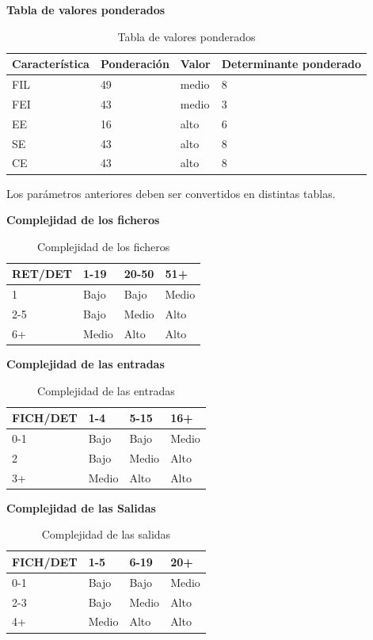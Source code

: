 \documentclass[a4paper,12pt,openany,oneside]{book}
\begin{document}
\begin{table}
\textbf{Tabla de valores ponderados}\\
\begin{tabular}{| l | l | l | l |}
\hline
\textbf{Característica} & \textbf{Ponderación} & \textbf{Valor} & \textbf{Determinante ponderado} \\
\hline
FIL & 49 & medio & 8\\
\hline
FEI & 43 & medio & 3\\
\hline
EE & 16  & alto  & 6\\
\hline
SE & 43  & alto  & 8\\
\hline
CE & 43  & alto  & 8\\
\hline
\end{tabular}
\caption{Tabla de valores ponderados}
\end{table}
Los parámetros anteriores deben ser convertidos en distintas tablas.
\begin{table}
\textbf{Complejidad de los ficheros}\\
\begin{tabular}{| l | l | l | l |}
\hline
\textbf{RET/DET} & \textbf{1-19} & \textbf{20-50} & \textbf{51+} \\
\hline
1 & Bajo & Bajo & Medio\\
\hline
2-5 & Bajo & Medio & Alto\\
\hline
6+ & Medio & Alto & Alto\\
\hline
\end{tabular}
\caption{Complejidad de los ficheros}
\end{table}
\begin{table}
\textbf{Complejidad de las entradas}\\
\begin{tabular}{| l | l | l | l |}
\hline
\textbf{FICH/DET} & \textbf{1-4} & \textbf{5-15} & \textbf{16+} \\
\hline
0-1 & Bajo & Bajo & Medio\\
\hline
2 & Bajo & Medio & Alto\\
\hline
3+ & Medio & Alto & Alto\\
\hline
\end{tabular}
\caption{Complejidad de las entradas}
\end{table}
\begin{table}
\textbf{Complejidad de las Salidas}\\
\begin{tabular}{| l | l | l | l |}
\hline
\textbf{FICH/DET} & \textbf{1-5} & \textbf{6-19} & \textbf{20+} \\
\hline
0-1 & Bajo & Bajo & Medio\\
\hline
2-3 & Bajo & Medio & Alto\\
\hline
4+ & Medio & Alto & Alto\\
\hline
\end{tabular}
\caption{Complejidad de las salidas}
\end{table}
\end{document}
